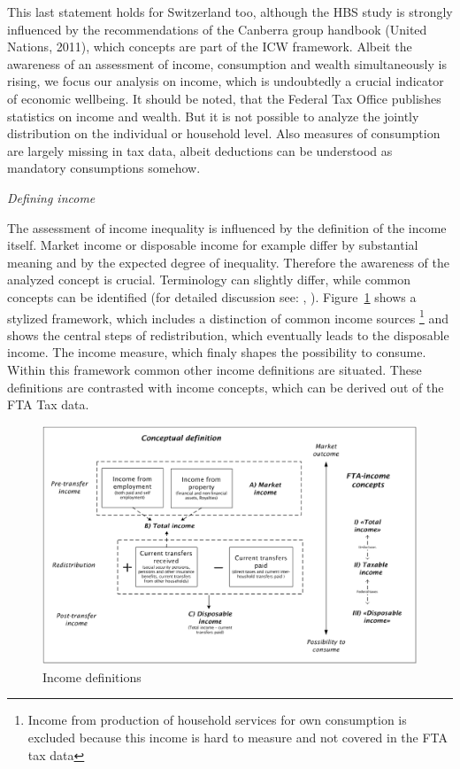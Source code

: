 \documentclass[twoside]{article}\usepackage[]{graphicx}\usepackage[]{color}
\makeatletter
\def\maxwidth{ %
  \ifdim\Gin@nat@width>\linewidth
    \linewidth
  \else
    \Gin@nat@width
  \fi
}
\makeatother
\begin{document}
\begin{multicols}{2}
This last statement holds for Switzerland too, although the HBS study is strongly influenced by the recommendations of the Canberra group handbook (United Nations, 2011), which concepts are part of the ICW framework. Albeit the awareness of an assessment of income, consumption and wealth simultaneously is rising, we  focus our analysis on income, which is undoubtedly a crucial indicator of economic wellbeing. It should be noted, that the Federal Tax Office publishes statistics on income and wealth. But it is not possible to analyze the jointly distribution on the individual or household level. Also measures of consumption are largely missing in tax data, albeit deductions can be understood as mandatory consumptions somehow.


\emph{Defining income}

The assessment of income inequality is influenced by the definition of the income itself. Market income or disposable income for example differ by substantial meaning and by the expected degree of inequality. Therefore the awareness of the analyzed concept is crucial. Terminology can slightly differ, while common concepts can be identified (for detailed discussion see: \citet[44]{oecd_oecd_2013 UNSICHER}, \citet[24]{united_nations_canberra_2011}). Figure~\ref{fig:incdef} shows a stylized framework, which includes a distinction of common income sources \footnote{Income from production of household services for own consumption is excluded because this income is hard to measure and not covered in the FTA tax data} and shows the central steps of redistribution, which eventually leads to the disposable income. The income measure, which finaly shapes the possibility to consume. Within this framework common other income definitions are situated. These definitions are contrasted with income concepts, which can be derived out of the FTA Tax data.

\begin{figure}
\centering
\includegraphics[width=\maxwidth]{figure/income_definition}
\caption{Income definitions}
\label{fig:incdef}
\end{figure}


\end{multicols}
\end{document}
